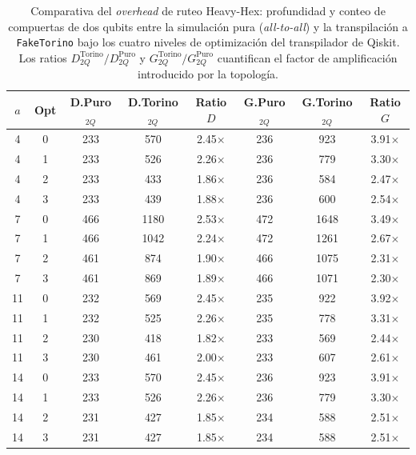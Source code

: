 \documentclass[12pt, spanish]{book}
\begin{document}
\newpage

\begin{table}[htpb]
    \centering
    \caption{Comparativa del \textit{overhead} de ruteo Heavy-Hex: profundidad y conteo de compuertas de dos qubits entre la simulación pura (\textit{all-to-all}) y la transpilación a \texttt{FakeTorino} bajo los cuatro niveles de optimización del transpilador de Qiskit. Los ratios $D_{2Q}^{\text{Torino}}/D_{2Q}^{\text{Puro}}$ y $G_{2Q}^{\text{Torino}}/G_{2Q}^{\text{Puro}}$ cuantifican el factor de amplificación introducido por la topología.}
    \label{tab:transpilacion_faketorino}
    \begin{tabular}{cccccccc}
        \toprule
        $a$ & \textbf{Opt} & \textbf{D.Puro$_{2Q}$} & \textbf{D.Torino$_{2Q}$} & \textbf{Ratio $D$} & \textbf{G.Puro$_{2Q}$} & \textbf{G.Torino$_{2Q}$} & \textbf{Ratio $G$} \\
        \midrule
        4  & 0 & 233 & 570  & 2.45$\times$ & 236 & 923  & 3.91$\times$ \\
        4  & 1 & 233 & 526  & 2.26$\times$ & 236 & 779  & 3.30$\times$ \\
        4  & 2 & 233 & 433  & 1.86$\times$ & 236 & 584  & 2.47$\times$ \\
        4  & 3 & 233 & 439  & 1.88$\times$ & 236 & 600  & 2.54$\times$ \\
        7  & 0 & 466 & 1180 & 2.53$\times$ & 472 & 1648 & 3.49$\times$ \\
        7  & 1 & 466 & 1042 & 2.24$\times$ & 472 & 1261 & 2.67$\times$ \\
        7  & 2 & 461 & 874  & 1.90$\times$ & 466 & 1075 & 2.31$\times$ \\
        7  & 3 & 461 & 869  & 1.89$\times$ & 466 & 1071 & 2.30$\times$ \\
        11 & 0 & 232 & 569  & 2.45$\times$ & 235 & 922  & 3.92$\times$ \\
        11 & 1 & 232 & 525  & 2.26$\times$ & 235 & 778  & 3.31$\times$ \\
        11 & 2 & 230 & 418  & 1.82$\times$ & 233 & 569  & 2.44$\times$ \\
        11 & 3 & 230 & 461  & 2.00$\times$ & 233 & 607  & 2.61$\times$ \\
        14 & 0 & 233 & 570  & 2.45$\times$ & 236 & 923  & 3.91$\times$ \\
        14 & 1 & 233 & 526  & 2.26$\times$ & 236 & 779  & 3.30$\times$ \\
        14 & 2 & 231 & 427  & 1.85$\times$ & 234 & 588  & 2.51$\times$ \\
        14 & 3 & 231 & 427  & 1.85$\times$ & 234 & 588  & 2.51$\times$ \\
        \bottomrule
    \end{tabular}
\end{table}
\end{document}
